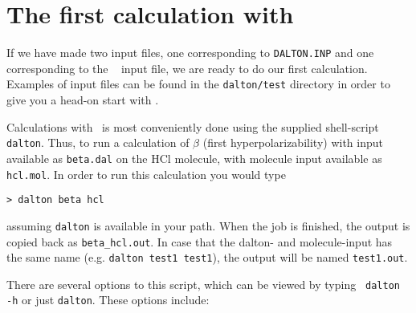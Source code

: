 \section{The first calculation with \siraba\ }\label{sec:firstcalc}

If we have made two input files, one corresponding to
\verb|DALTON.INP| and one corresponding to the \mol\
 input file, we
are ready to do our first calculation. Examples of input files can be
found in the \verb|dalton/test| directory in order to give you a
head-on start with \siraba .

Calculations with \siraba\ is most conveniently done using the
supplied shell-script \verb|dalton|. Thus,
to run a calculation of
$\beta$ (first hyperpolarizability)
with input available as
\verb|beta.dal| on the HCl molecule, with molecule input available as
\verb|hcl.mol|. In order to run this calculation you would type

\begin{verbatim}
> dalton beta hcl
\end{verbatim}
assuming \verb|dalton| is available in your path. When the job is
finished, the output is copied back as \verb|beta_hcl.out|. In case that the
dalton- and molecule-input has the same name (e.g. \verb|dalton test1 test1|), the output
will be named \verb|test1.out|.

There are several options to this script, which can be viewed by
typing \verb| dalton -h| or just \verb|dalton|. These options include:

